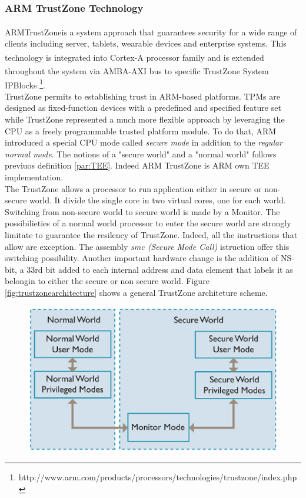 \documentclass[../tesi.tex]{subfiles}
\begin{document}
{\subsubsection{ARM TrustZone Technology}
ARM\textsuperscript\textregistered TrustZone\textsuperscript\textregistered is a system approach that guarantees security for a wide range of clients including server, tablets, wearable devices and enterprise systems. This technology is integrated into Cortex\textsuperscript\textregistered -A processor family and is extended throughout the system via AMBA\textsuperscript\textregistered -AXI bus to specific TrustZone System IPBlocks  \footnote{http://www.arm.com/products/processors/technologies/trustzone/index.php}. \\
TrustZone permits to establishing trust in ARM-based platforms. TPMs are designed as fixed-function devices with a predefined and specified feature set while TrustZone represented a much more flexible approach by leveraging the CPU as a freely programmable trusted platform module. To do that, ARM introduced a special CPU mode called \emph{secure mode} in addition to the \emph{regular normal mode}. The notions of a "secure world" and a "normal world" follows previuos definition \ref{par:TEE}. Indeed ARM TrustZone is ARM own TEE implementation. \\
The TrustZone allows a processor to run application either in secure or non-secure world. It divide the single core in two virtual cores, one for each world. Switching from non-secure world to secure world is made by a Monitor. The possibilieties of a normal world processor to enter the secure world are strongly limitate to guarantee the resilency of TrustZone. Indeed, all the instructions that allow are exception. The assembly \emph{smc (Secure Mode Call)} istruction offer this switching possibility. Another important hardware change is the addition of NS-bit, a 33rd bit added to each internal address and data element that labels it as belongin to either the secure or non secure world. Figure \ref{fig:trustzonearchitecture} shows a general TrustZone architeture scheme. \\
\begin{figure}
\centering
\includegraphics[scale=0.60]{images/trustzonearchitecture.jpg}

\end{figure}}
\end{document}
